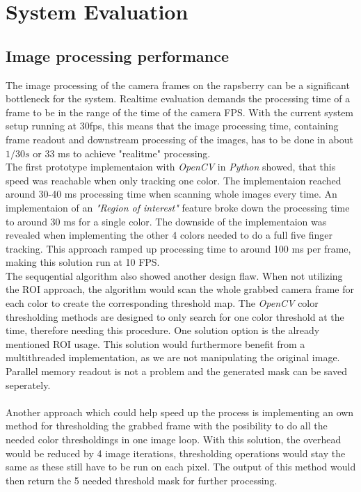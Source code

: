 \chapter{System Evaluation}
\section{Image processing performance}
The image  processing of the camera frames on the rapsberry can be a significant bottleneck for the system. Realtime evaluation demands the processing time of a frame to be in the range of the time of the camera FPS. With the current system setup running at 30fps, this means that the image processing time, containing frame readout and downstream processing of the images, has to be done in about $1/30s$ or 33 ms to achieve "realitme" processing.\\ 
The first prototype implementaion with \textit{OpenCV} in \textit{Python} showed, that this speed was reachable when only tracking one color. The implementaion reached around 30-40 ms processing time when scanning whole images every time. An implementaion of an \textit{"Region of interest"} feature  broke down the processing time to around 30 ms for a single color. The downside of the implementaion was revealed when implementing the other 4 colors needed to do a full five finger tracking. This approach ramped up processing time to around 100 ms per frame, making this solution run at 10 FPS.\\ 
The sequqential algorithm also showed another design flaw. When not utilizing the ROI approach, the algorithm would scan the whole grabbed camera frame for each color to create the corresponding threshold map. The \textit{OpenCV} color thresholding methods are designed to only search for one color threshold at the time, therefore needing this procedure. One solution option is the already mentioned ROI usage. This solution would furthermore benefit from a multithreaded implementation, as we are not manipulating the original image. Parallel memory readout is not a problem and the generated mask can be saved seperately.\\
\\
Another approach which could help speed up the process is implementing an own method for thresholding the grabbed frame with the posibility to do all the needed color thresholdings in one image loop. With this solution, the overhead would be reduced by 4 image iterations, thresholding operations would stay the same as these still have to be run on each pixel. The output of this method would then return the 5 needed threshold mask for further processing.\\
